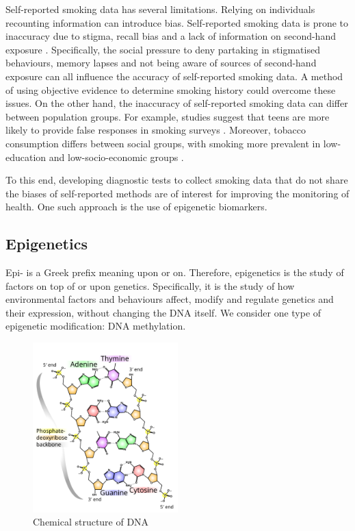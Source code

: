 \documentclass{article} %
\begin{document}
Self-reported smoking data has several limitations. Relying on individuals recounting information can introduce bias. Self-reported smoking data is prone to inaccuracy due to stigma, recall bias and a lack of information on second-hand exposure \cite{park2015correlation, gorber2009accuracy}. Specifically, the social pressure to deny partaking in stigmatised behaviours, memory lapses and not being aware of sources of second-hand exposure can all influence the accuracy of self-reported smoking data. A method of using objective evidence to determine smoking history could overcome these issues. On the other hand, the inaccuracy of self-reported smoking data can differ between population groups. For example, studies suggest that teens are more likely to provide false responses in smoking surveys \cite{park2015correlation}. Moreover, tobacco consumption differs between social groups, with smoking more prevalent in low-education and low-socio-economic groups \cite{cdc2019_smoking}.

To this end, developing diagnostic tests to collect smoking data that do not share the biases of self-reported methods are of interest for improving the monitoring of health. One such approach is the use of epigenetic biomarkers.

\subsection{Epigenetics}
Epi- is a Greek prefix meaning upon or on. Therefore, epigenetics is the study of factors on top of or upon genetics. Specifically, it is the study of how environmental factors and behaviours affect, modify and regulate genetics and their expression, without changing the DNA itself. We consider one type of epigenetic modification: DNA methylation.

\begin{figure}
    \centering
    \includegraphics[width=0.5\textwidth]{512px-DNA_chemical_structure.svg.png}
    \caption[Chemical structure of DNA]{Chemical structure of DNA \cite{ball_DNA_structure}}
    \label{fig:dna-structure}
\end{figure}
\end{document}

